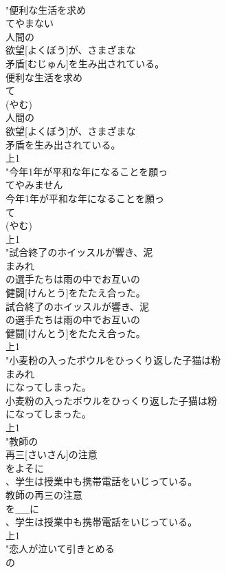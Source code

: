 \documentclass[8pt]{extreport}
\begin{document}
\begin{CJK}{UTF8}{min}
\\	"便利な生活を求め
\\	てやまない
\\	人間の
\\	欲望[よくぼう]が、さまざまな
\\	矛盾[むじゅん]を生み出されている。
\\	便利な生活を求め
\\	て
\\	(やむ)
\\	人間の
\\	欲望[よくぼう]が、さまざまな
\\	矛盾を生み出されている。
\\	上1
\\	"今年1年が平和な年になることを願っ
\\	てやみません
\\	今年1年が平和な年になることを願っ
\\	て
\\	(やむ)
\\	上1
\\	"試合終了のホイッスルが響き、泥
\\	まみれ
\\	の選手たちは雨の中でお互いの
\\	健闘[けんとう]をたたえ合った。
\\	試合終了のホイッスルが響き、泥
\\	の選手たちは雨の中でお互いの
\\	健闘[けんとう]をたたえ合った。
\\	上1
\\	"小麦粉の入ったボウルをひっくり返した子猫は粉
\\	まみれ
\\	になってしまった。
\\	小麦粉の入ったボウルをひっくり返した子猫は粉
\\	になってしまった。
\\	上1
\\	"教師の
\\	再三[さいさん]の注意
\\	をよそに
\\	、学生は授業中も携帯電話をいじっている。
\\	教師の再三の注意
\\	を__に
\\	、学生は授業中も携帯電話をいじっている。
\\	上1
\\	"恋人が泣いて引きとめる
\\	の

\end{CJK}
\end{document}

